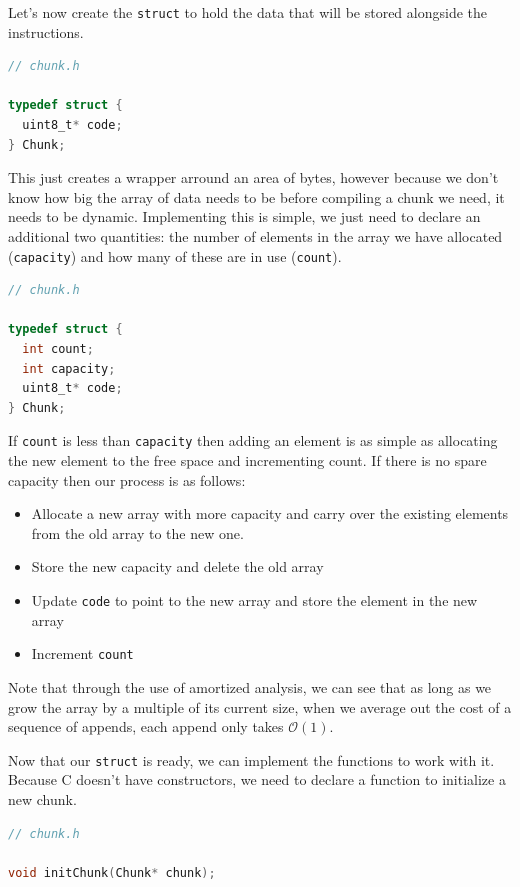 Let's now create the \verb+struct+ to hold the data that will be stored alongside the instructions.

\begin{lstlisting}[language=C]
// chunk.h

typedef struct {
  uint8_t* code;
} Chunk;
\end{lstlisting}

This just creates a wrapper arround an area of bytes, however because we don't know how big the array of data needs to be before compiling a chunk we need, it needs to be dynamic. Implementing this is simple, we just need to declare an additional two quantities: the number of elements in the array we have allocated (\verb+capacity+) and how many of these are in use (\verb+count+).

\begin{lstlisting}[language=C]
// chunk.h

typedef struct {
  int count;
  int capacity;
  uint8_t* code;
} Chunk;
\end{lstlisting}

If \verb+count+ is less than \verb.capacity. then adding an element is as simple as allocating the new element to the free space and incrementing count. If there is no spare capacity then our process is as follows: 

\begin{itemize}
 \item Allocate a new array with more capacity and carry over the existing elements from the old array to the new one. 
 \item Store the new capacity and delete the old array
 \item Update \verb+code+ to point to the new array and store the element in the new array
 \item Increment \verb+count+
\end{itemize}

Note that through the use of amortized analysis, we can see that as long as we grow the array by a multiple of its current size, when we average out the cost of a sequence of appends, each append only takes \(\mathcal{O}(1)\).

Now that our \verb.struct. is ready, we can implement the functions to work with it. Because C doesn't have constructors, we need to declare a function to initialize a new chunk.

\begin{lstlisting}[language=C]
// chunk.h

void initChunk(Chunk* chunk);
\end{lstlisting}

